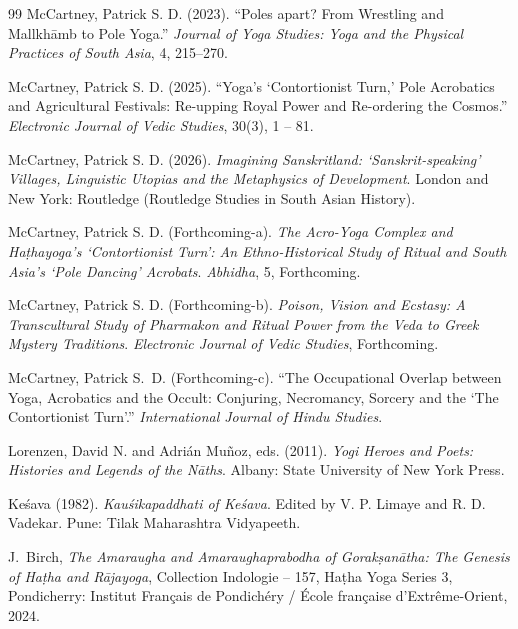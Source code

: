 \documentclass[11pt,twoside,letterpaper]{article}
\begin{document}
\begin{thebibliography}{99}
McCartney, Patrick S. D. (2023). ``Poles apart? From Wrestling and Mallkhāmb to Pole Yoga.'' \textit{Journal of Yoga Studies: Yoga and the Physical Practices of South Asia}, 4, 215–270.

McCartney, Patrick S. D. (2025). ``Yoga's `Contortionist Turn,' Pole Acrobatics and Agricultural Festivals: Re-upping Royal Power and Re-ordering the Cosmos.'' \textit{Electronic Journal of Vedic Studies}, 30(3), 1 -- 81.

McCartney, Patrick S. D. (2026). \textit{Imagining Sanskritland: `Sanskrit-speaking' Villages, Linguistic Utopias and the Metaphysics of Development}. London and New York: Routledge (Routledge Studies in South Asian History).

McCartney, Patrick S. D. (Forthcoming-a). \textit{The Acro-Yoga Complex and Haṭhayoga's `Contortionist Turn': An Ethno-Historical Study of Ritual and South Asia's `Pole Dancing' Acrobats}. \textit{Abhidha}, 5, Forthcoming.

McCartney, Patrick S. D. (Forthcoming-b). \textit{Poison, Vision and Ecstasy: A Transcultural Study of Pharmakon and Ritual Power from the Veda to Greek Mystery Traditions}. \textit{Electronic Journal of Vedic Studies}, Forthcoming.

McCartney, Patrick S.~D. (Forthcoming-c). ``The Occupational Overlap between Yoga, Acrobatics and the Occult: Conjuring, Necromancy, Sorcery and the `The Contortionist Turn'.'' \textit{International Journal of Hindu Studies}.

Lorenzen, David N. and Adrián Muñoz, eds. (2011). \textit{Yogi Heroes and Poets: Histories and Legends of the Nāths}. Albany: State University of New York Press.

Keśava (1982). \textit{Kauśikapaddhati of Keśava}. Edited by V. P. Limaye and R. D. Vadekar. Pune: Tilak Maharashtra Vidyapeeth.

J.~Birch, \textit{The Amaraugha and Amaraughaprabodha of Gorakṣanātha: The Genesis of Haṭha and Rājayoga}, Collection Indologie -- 157, Haṭha Yoga Series 3, Pondicherry: Institut Français de Pondichéry / École française d'Extrême-Orient, 2024.


\end{thebibliography}
\end{document}
